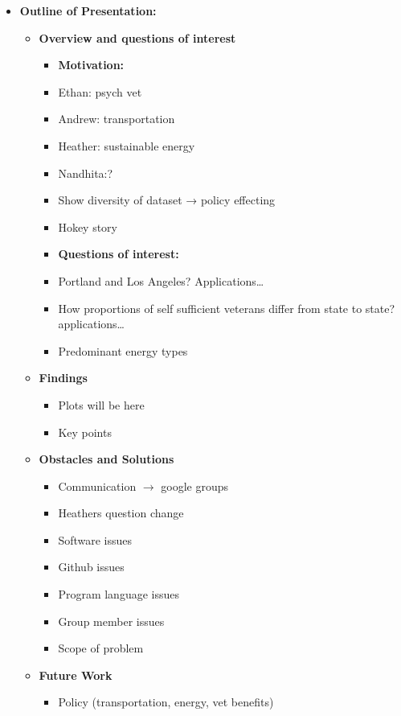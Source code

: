 \documentclass[12pt]{article}
\begin{document}
\begin{itemize}
\item \textbf{Outline of Presentation:}
\begin{itemize}
\item \textbf{Overview and questions of interest}
\begin{itemize}
\item \textbf{Motivation:}
\item Ethan: psych vet 
\item Andrew: transportation 
\item Heather: sustainable energy 
\item Nandhita:? 
\item Show diversity of dataset → policy effecting 
\item Hokey story 
\item \textbf{Questions of interest:}
\item Portland and Los Angeles? Applications… 
\item How proportions of self sufficient veterans differ from state to state? applications… 
\item Predominant energy types 
\end{itemize}
\item \textbf{Findings}
\begin{itemize}
\item Plots will be here 
\item Key points 
\end{itemize}
\item \textbf{Obstacles and Solutions}
\begin{itemize}
\item Communication $\rightarrow$ google groups
\item Heathers question change
\item Software issues 
\item Github issues 
\item Program language issues 
\item Group member issues 
\item Scope of problem 
\end{itemize}
\item \textbf{Future Work}
\begin{itemize}
\item Policy  (transportation, energy, vet benefits)
\end{itemize}
\end{itemize}
\end{itemize}





\end{document}
